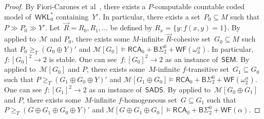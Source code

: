 \documentclass{article}
\numberwithin{theorem}{section}
\newtheorem{proposition}[theorem]{Proposition}
\newtheorem{corollary}[theorem]{Corollary}
\newcommand{\RCA}{\mathsf{RCA}}
\newcommand{\WKL}{\mathsf{WKL}}
\newcommand{\SEM}{\mathsf{SEM}}
\newcommand{\SADS}{\mathsf{SADS}}
\newcommand{\BSig}{\mathsf{B}\Sigma^0}
\newcommand{\WF}{\mathsf{WF}}
\newcommand{\M}{\mathcal{M}}
\begin{document}
\begin{proof}
By Fiori-Carones et al~\cite[Lemma 3.2]{fiori2021isomorphism}, there exists a $P$-computable countable coded model of~$\WKL_0^*$ containing~$Y'$. In particular, there exists a set~$P_0 \subseteq M$ such that $P \gg P_0 \gg Y'$.
Let~$\vec{R} = R_0, R_1, \dots$ be defined by $R_x = \{ y : f(x, y) = 1 \}$.
By  applied to~$\M$ and $P_0$, there exists some $M$-infinite $\vec{R}$-cohesive set~$G_0 \subseteq M$ such that $P_0 \geq_T (G_0 \oplus Y)'$ and $\M[G_0] \models \RCA_0 + \BSig_2 + \WF(\omega_3^{\alpha})$. In particular, $f : [G_0]^2 \to 2$ is stable. One can see~$f : [G_0]^2 \to 2$ as an instance of~$\SEM$.
By  applied to~$\M[G_0]$ and $P$, there exists some~$M$-infinite $f$-transitive set~$G_1 \subseteq G_0$ such that $P \geq_T (G_1 \oplus G_0 \oplus Y)'$ and $\M[G_1 \oplus G_0] \models \RCA_0 + \BSig_2 + \WF(\omega_2^\alpha)$. One can see $f : [G_1]^2 \to 2$ as an instance of~$\SADS$.
By  applied to~$\M[G_0 \oplus G_1]$ and $P$, there exists some~$M$-infinite $f$-homogeneous set~$G \subseteq G_1$ such that $P \geq_T (G \oplus G_1 \oplus G_0 \oplus Y)'$ and $\M[G \oplus G_1 \oplus G_0] \models \RCA_0 + \BSig_2 + \WF(\alpha)$.
\end{proof}

\end{document}
